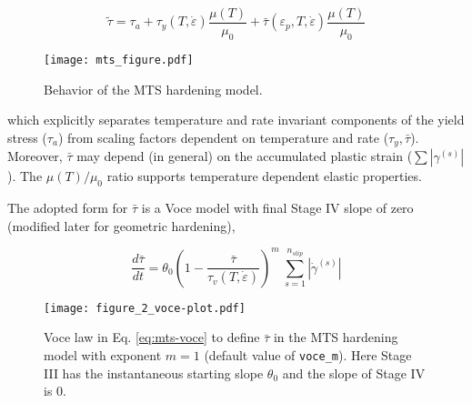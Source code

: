 \documentclass[11pt]{report}
\numberwithin{equation}{section}
\newcommand{\ttt} {\texttt}  %
\begin{document}
\begin{equation}
\tilde{\tau}=\tau_{a}+\tau_{y}\left(T,\dot{\varepsilon}\right)\frac{\mu (T)}
{\mu_{0}}+\bar \tau\left(\varepsilon_{p},T,
\dot{\varepsilon}\right)\frac{\mu (T)}{\mu_{0}}\label{eq:strength-split}
\end{equation}


 
\begin{figure}[htb]
\begin{center}
\texttt{[image: mts\_figure.pdf]} 
\caption{{\small  Behavior of the MTS hardening model.} \label{fig:mts}}
%
\end{center}
\end{figure}
%

\noindent which explicitly separates temperature and rate invariant
components of the yield stress ($\tau_a$) from scaling factors
dependent on temperature and rate ($\tau_{y}, \bar \tau$). Moreover, 
$\bar \tau$ may depend (in general) on the accumulated plastic strain ($
\sum|\gamma^{(s)}|$). The $\mu(T)/\mu_{0}$
ratio supports temperature dependent elastic properties. 



The adopted form for $\bar \tau$ is a Voce model with final Stage IV slope of zero
(modified later for geometric hardening),

\begin{equation}
\frac{d\bar{\tau}}{dt}=\theta_{0}\left ( 1-\frac{\bar{\tau}}{\tau_{v}
\left(T,\dot{\varepsilon}\right )}\right )^m \ 
\sum \limits _{s=1}^{n_{slip}}\left|\dot{\gamma}^{\left(s\right)}\right|\label{eq:mts-voce}
\end{equation}


\begin{figure}
\begin{centering}
\texttt{[image: figure\_2\_voce-plot.pdf]}
\par\end{centering} 

\caption{\small Voce law in Eq. \ref{eq:mts-voce} to define $\bar \tau$ in the MTS hardening model with exponent $m=1$ (default value of \ttt{voce\_m}). Here Stage
III has the instantaneous starting slope $\theta_{0}$ and the 
slope of Stage IV is $0$. \normalsize\label{fig:Simplified-Voce-law}}
\end{figure}
\end{document}
